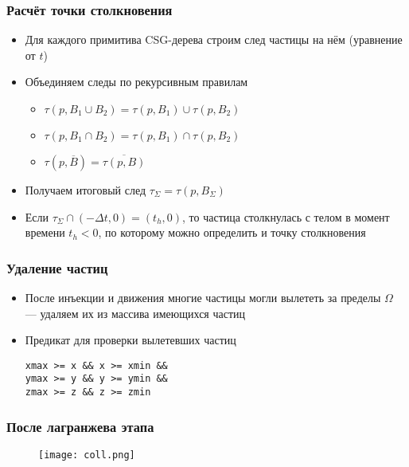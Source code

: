 \documentclass[onlymath]{beamer}
\begin{document}
\begin{frame}
  \frametitle{Расчёт точки столкновения}
  \begin{itemize}
  \item Для каждого примитива CSG-дерева строим след частицы на нём
    (уравнение от $t$)
  \item Объединяем следы по рекурсивным правилам
    \begin{itemize}
    \item $\tau(p, B_1 \cup B_2) = \tau(p, B_1) \cup \tau(p, B_2)$
    \item $\tau(p, B_1 \cap B_2) = \tau(p, B_1) \cap \tau(p, B_2)$
    \item $\tau(p, \overline{B}) = \overline{\tau(p, B)}$
    \end{itemize}
  \item Получаем итоговый след $\tau_\Sigma = \tau(p, B_\Sigma)$
  \item Если $\tau_\Sigma \cap (-\Delta t, 0) = (t_h, 0)$, то
    частица столкнулась с телом в момент времени $t_h < 0$, по
    которому можно определить и точку столкновения
  \end{itemize}
\end{frame}

\begin{frame}[fragile]
  \frametitle{Удаление частиц}
  \begin{itemize}
  \item После инъекции и движения многие частицы могли вылететь за
    пределы $\Omega$ — удаляем их из массива имеющихся частиц
  \item Предикат для проверки вылетевших частиц
\begin{lstlisting}
xmax >= x && x >= xmin &&
ymax >= y && y >= ymin &&
zmax >= z && z >= zmin
\end{lstlisting}
  \end{itemize}
\end{frame}

\begin{frame}
  \frametitle{После лагранжева этапа}
  \begin{figure}
    \centering
    \texttt{[image: coll.png]}
  \end{figure}
\end{frame}
\end{document}
